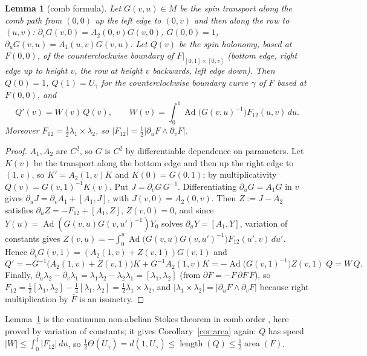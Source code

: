 \documentclass[11pt,reqno]{amsart}
\newtheorem{lemma}[theorem]{Lemma}
\theoremstyle{definition}
\theoremstyle{remark}
\numberwithin{equation}{section}
\newcommand{\Ad}{\operatorname{Ad}}
\begin{document}
\begin{lemma}[comb formula]\label{lem:comb}
Let $G(v,u)\in M$ be the spin transport along the comb path from $(0,0)$ up the left edge to $(0,v)$ and then along the row to
$(u,v)$: $\partial_vG(v,0)=A_2(0,v)G(v,0)$, $G(0,0)=1$, $\partial_uG(v,u)=A_1(u,v)G(v,u)$.  Let $Q(v)$ be the spin holonomy, based at
$F(0,0)$, of the counterclockwise boundary of $F|_{[0,1]\times[0,v]}$ (bottom edge, right edge up to height $v$, the row at height $v$
backwards, left edge down).  Then $Q(0)=1$, $Q(1)=U_\gamma$ for the counterclockwise boundary curve $\gamma$ of $F$ based at $F(0,0)$, and
\[
Q'(v)=W(v)\,Q(v),\qquad W(v)=\int_0^1\Ad\bigl(G(v,u)^{-1}\bigr)F_{12}(u,v)\,du .
\]
Moreover $F_{12}=\tfrac12\lambda_1\times\lambda_2$, so $\lvert F_{12}\rvert=\tfrac12\lvert\partial_uF\wedge\partial_vF\rvert$.
\end{lemma}
\begin{proof}
$A_1,A_2$ are $C^2$, so $G$ is $C^2$ by differentiable dependence on parameters.  Let $K(v)$ be the transport along the bottom edge and then
up the right edge to $(1,v)$, so $K'=A_2(1,v)K$ and $K(0)=G(0,1)$; by multiplicativity $Q(v)=G(v,1)^{-1}K(v)$.  Put $J=\partial_vG\,G^{-1}$.
Differentiating $\partial_uG=A_1G$ in $v$ gives $\partial_uJ=\partial_vA_1+[A_1,J]$, with $J(v,0)=A_2(0,v)$.  Then $Z:=J-A_2$ satisfies
$\partial_uZ=-F_{12}+[A_1,Z]$, $Z(v,0)=0$, and since $Y(u)=\Ad(G(v,u)G(v,u')^{-1})Y_0$ solves $\partial_uY=[A_1,Y]$, variation of constants gives
$Z(v,u)=-\int_0^u\Ad\bigl(G(v,u)G(v,u')^{-1}\bigr)F_{12}(u',v)\,du'$.  Hence $\partial_vG(v,1)=(A_2(1,v)+Z(v,1))G(v,1)$ and
\[
Q'=-G^{-1}\bigl(A_2(1,v)+Z(v,1)\bigr)K+G^{-1}A_2(1,v)K=-\Ad\bigl(G(v,1)^{-1}\bigr)Z(v,1)\;Q=W\,Q .
\]
Finally, $\partial_u\lambda_2-\partial_v\lambda_1=\lambda_1\lambda_2-\lambda_2\lambda_1=[\lambda_1,\lambda_2]$ (from $\partial\bar F=-\bar F\,\partial F\,\bar F$), so
$F_{12}=\tfrac12[\lambda_1,\lambda_2]-\tfrac14[\lambda_1,\lambda_2]=\tfrac12\lambda_1\times\lambda_2$, and $\lvert\lambda_1\times\lambda_2\rvert=\lvert\partial_uF\wedge\partial_vF\rvert$
because right multiplication by $\bar F$ is an isometry.
\end{proof}

Lemma~\ref{lem:comb} is the continuum non-abelian Stokes theorem in comb order \cite{Arefeva,KMR}, here proved by variation of
constants; it gives Corollary~\ref{cor:area} again: $Q$ has speed $\lvert W\rvert\le\int_0^1\lvert F_{12}\rvert\,du$, so
$\tfrac12\Theta(U_\gamma)=d(1,U_\gamma)\le\operatorname{length}(Q)\le\tfrac12\operatorname{area}(F)$.
\end{document}
